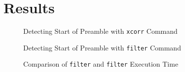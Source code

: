 \documentclass{article}
\begin{document}
\section{Results}

\begin{figure}[H]
	\centerline{}
	\caption{Detecting Start of Preamble with \texttt{xcorr} Command}
	\label{fig::xcorr_preamble_detect}
\end{figure}

\begin{figure}[H]
	\centerline{}
	\caption{Detecting Start of Preamble with \texttt{filter} Command}
	\label{fig::filter_preamble_detect}
\end{figure}

\begin{figure}[H]
	\centerline{}
	\caption{Comparison of \texttt{filter} and \texttt{filter} Execution Time}
	\label{fig::execution_time}
\end{figure}
\end{document}
